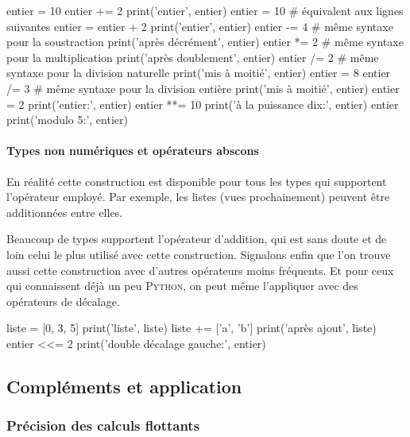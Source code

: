 \begin{idleconsole}
	\begin{pyconsole}
		entier = 10
		entier += 2
		print('entier', entier)
		entier = 10  # équivalent aux lignes suivantes
		entier = entier + 2
		print('entier', entier)
		entier -= 4  # même syntaxe pour la soustraction
		print('après décrément', entier)
		entier *= 2  # même syntaxe pour la multiplication
		print('après doublement', entier)
		entier /= 2  # même syntaxe pour la division naturelle
		print('mis à moitié', entier)
		entier = 8
		entier /= 3  # même syntaxe pour la division entière
		print('mis à moitié', entier)
		entier = 2
		print('entier:', entier)
		entier **= 10
		print('à la puissance dix:', entier)
		entier %
		print('modulo 5:', entier)
	\end{pyconsole}
\end{idleconsole}

\vspace{-1pt}

\paragraph{Types non numériques et opérateurs abscons} En réalité cette construction est disponible pour tous les types qui supportent l'opérateur employé. Par exemple, les listes (vues prochainement) peuvent être additionnées entre elles. 

Beaucoup de types supportent l'opérateur d'addition, qui est sans doute et de loin celui le plus utilisé avec cette construction. Signalons enfin que l'on trouve aussi cette construction avec d'autres opérateurs moins fréquents. Et pour ceux qui connaissent déjà un peu \textsc{Python}, on peut même l'appliquer avec des opérateurs de décalage.

\begin{idleconsole}
	\begin{pyconsole}
		liste = [0, 3, 5]
		print('liste', liste)
		liste += ['a', 'b']
		print('après ajout', liste)
		entier <<= 2
		print('double décalage gauche:', entier)
	\end{pyconsole}
\end{idleconsole}


\subsection[Compléments et application]{Compléments et application}
\label{sub:X.3.2}


\subsubsection[Précision des calculs flottants]{Précision des calculs flottants}
\label{subsub:X.3.2.1}

